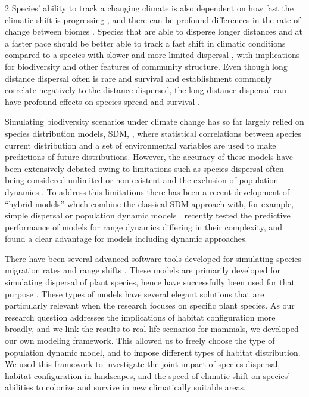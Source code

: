 \documentclass[12pt,pdftex]{article}
\begin{document}
\begin{spacing}{2}
Species' ability to track a changing climate is also dependent on how fast the climatic shift is progressing \citep{Schloss2012a}, and there can be profound differences in the rate of change between biomes \citep{Stocker2013, Loarie2009}. Species that are able to disperse longer distances and at a faster pace should be better able to track a fast shift in climatic conditions compared to a species with slower and more limited dispersal \citep{Walther2002, Angert2011}, with implications for biodiversity and other features of community structure. Even though long distance dispersal often is rare and survival and establishment commonly correlate negatively to the distance dispersed, the long distance dispersal can have profound effects on species spread and survival \citep{Nathan2006} . 

Simulating biodiversity scenarios under climate change has so far largely relied on species distribution models, SDM, \citep{Guisan2000, Thomas2006a}, where statistical correlations between species current distribution and a set of environmental variables are used to make predictions of future distributions. However, the accuracy of these models have been extensively debated \citep{Thuiller2013, Araujo2012a, Wiens2009} owing to limitations such as species dispersal often being considered unlimited or non-existent \citep{Peterson2001, Thuiller2005a} and the exclusion of population dynamics \citep{Zurell2009}. To address this limitations there has been a recent development of ``hybrid models'' which combine the classical SDM approach with, for example, simple dispersal or population dynamic models \citep{Ehrlen2015}. \cite{Zurell2016} recently tested the predictive performance of  models for range dynamics differing in their complexity, and found a clear advantage for models including dynamic approaches. 

There have been several advanced software tools developed for simulating species migration rates \citep{Collingham1996} and range shifts \citep{Midgley2010, Schumaker2013}. These models are primarily developed for simulating dispersal of plant species, hence have successfully been used for that purpose \citep{Perez-Garcia2017}. These types of models have several elegant solutions that are particularly relevant when the research focuses on specific plant species. As our research question addresses the implications of habitat configuration more broadly, and we link the results to real life scenarios for mammals, we developed our own modeling framework. This allowed us to freely choose the type of population dynamic model, and  to impose different types of habitat distribution. We used this framework to investigate the joint impact of species dispersal, habitat configuration in landscapes, and the speed of climatic shift on species' abilities to colonize and survive in new climatically suitable areas.



\end{spacing}
\end{document}
